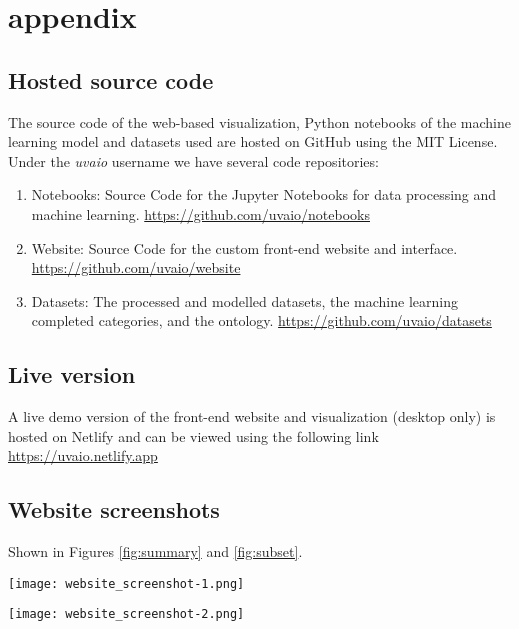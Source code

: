 \section{appendix}

\subsection{Hosted source code}

The source code of the web-based visualization, Python notebooks of the machine learning model and datasets used are hosted on GitHub using the MIT License. Under the \textit{uvaio} username we have several code repositories:

\begin{enumerate}
  \item Notebooks: Source Code for the Jupyter Notebooks for data processing and machine learning. \underline{https://github.com/uvaio/notebooks}
  \item Website: Source Code for the custom front-end website and interface. \underline{https://github.com/uvaio/website}
  \item Datasets: The processed and modelled datasets, the machine learning completed categories, and the ontology. \underline{https://github.com/uvaio/datasets}
\end{enumerate}

\subsection{Live version}
A live demo version of the front-end website and visualization (desktop only) is hosted on Netlify and can be viewed using the following link \underline{https://uvaio.netlify.app}


\subsection{Website screenshots}

Shown in Figures \ref{fig:summary} and \ref{fig:subset}.


 \begin{figure*}[!]
    \centering
    \texttt{[image: website\_screenshot-1.png]}
    \caption{Screenshot of the 'overview landing page' of the  website}
    \label{fig:summary}
\end{figure*}

 \begin{figure*}[!]
    \centering
    \texttt{[image: website\_screenshot-2.png]}
    \caption{Screenshot of the detail 'create a subset' page of the website}
    \label{fig:subset}
\end{figure*}
